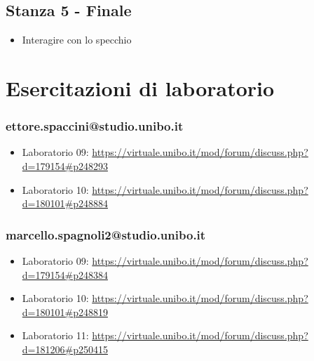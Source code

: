 \documentclass[a4paper,12pt]{report}
\begin{document}
\section{Stanza 5 - Finale}
\begin{itemize}
	\item Interagire con lo specchio
\end{itemize}

\appendix
\chapter{Esercitazioni di laboratorio}

 
\subsection{ettore.spaccini@studio.unibo.it}

\begin{itemize}
 \item Laboratorio 09: \url{https://virtuale.unibo.it/mod/forum/discuss.php?d=179154#p248293}
 \item Laboratorio 10: \url{https://virtuale.unibo.it/mod/forum/discuss.php?d=180101#p248884}
\end{itemize}

\subsection{marcello.spagnoli2@studio.unibo.it}

\begin{itemize}
 \item Laboratorio 09: \url{https://virtuale.unibo.it/mod/forum/discuss.php?d=179154#p248384}
 \item Laboratorio 10: \url{https://virtuale.unibo.it/mod/forum/discuss.php?d=180101#p248819}
 \item Laboratorio 11: \url{https://virtuale.unibo.it/mod/forum/discuss.php?d=181206#p250415}
\end{itemize}





\end{document}
